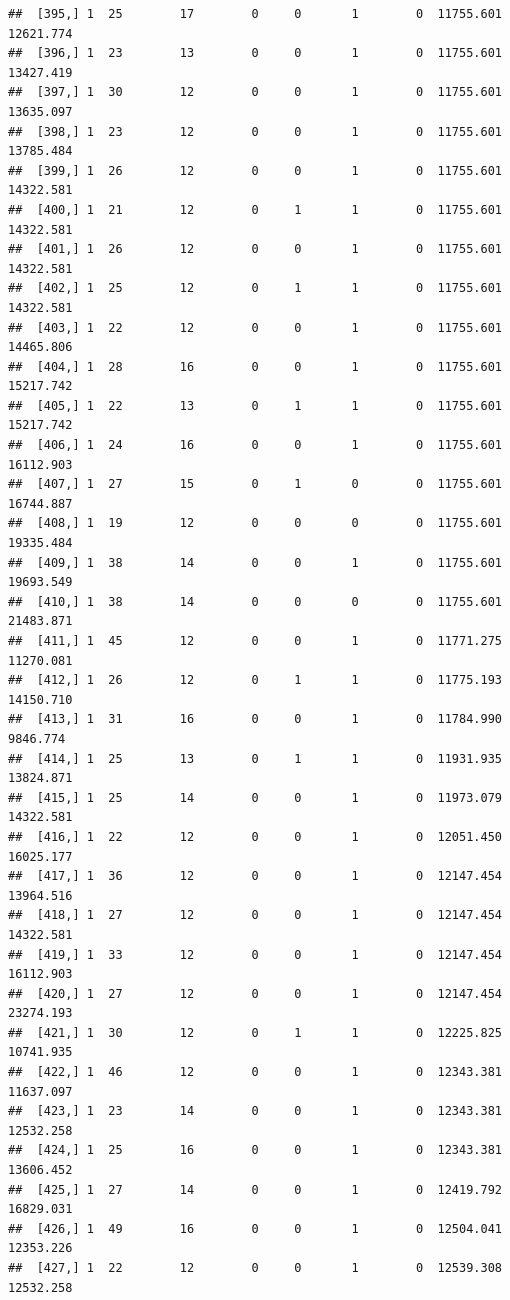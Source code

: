 \documentclass[
]{article}
\begin{document}
\begin{verbatim}
##  [395,] 1  25        17        0     0       1        0  11755.601  12621.774
##  [396,] 1  23        13        0     0       1        0  11755.601  13427.419
##  [397,] 1  30        12        0     0       1        0  11755.601  13635.097
##  [398,] 1  23        12        0     0       1        0  11755.601  13785.484
##  [399,] 1  26        12        0     0       1        0  11755.601  14322.581
##  [400,] 1  21        12        0     1       1        0  11755.601  14322.581
##  [401,] 1  26        12        0     0       1        0  11755.601  14322.581
##  [402,] 1  25        12        0     1       1        0  11755.601  14322.581
##  [403,] 1  22        12        0     0       1        0  11755.601  14465.806
##  [404,] 1  28        16        0     0       1        0  11755.601  15217.742
##  [405,] 1  22        13        0     1       1        0  11755.601  15217.742
##  [406,] 1  24        16        0     0       1        0  11755.601  16112.903
##  [407,] 1  27        15        0     1       0        0  11755.601  16744.887
##  [408,] 1  19        12        0     0       0        0  11755.601  19335.484
##  [409,] 1  38        14        0     0       1        0  11755.601  19693.549
##  [410,] 1  38        14        0     0       0        0  11755.601  21483.871
##  [411,] 1  45        12        0     0       1        0  11771.275  11270.081
##  [412,] 1  26        12        0     1       1        0  11775.193  14150.710
##  [413,] 1  31        16        0     0       1        0  11784.990   9846.774
##  [414,] 1  25        13        0     1       1        0  11931.935  13824.871
##  [415,] 1  25        14        0     0       1        0  11973.079  14322.581
##  [416,] 1  22        12        0     0       1        0  12051.450  16025.177
##  [417,] 1  36        12        0     0       1        0  12147.454  13964.516
##  [418,] 1  27        12        0     0       1        0  12147.454  14322.581
##  [419,] 1  33        12        0     0       1        0  12147.454  16112.903
##  [420,] 1  27        12        0     0       1        0  12147.454  23274.193
##  [421,] 1  30        12        0     1       1        0  12225.825  10741.935
##  [422,] 1  46        12        0     0       1        0  12343.381  11637.097
##  [423,] 1  23        14        0     0       1        0  12343.381  12532.258
##  [424,] 1  25        16        0     0       1        0  12343.381  13606.452
##  [425,] 1  27        14        0     0       1        0  12419.792  16829.031
##  [426,] 1  49        16        0     0       1        0  12504.041  12353.226
##  [427,] 1  22        12        0     0       1        0  12539.308  12532.258

\end{verbatim}
\end{document}
